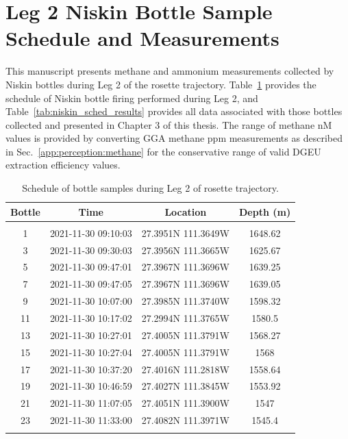 \section{Leg 2 Niskin Bottle Sample Schedule and Measurements}
\label{app:perception:niskin}
This manuscript presents methane and ammonium measurements collected by Niskin bottles during Leg 2 of the rosette trajectory. Table~\ref{tab:niskin_sched} provides the schedule of Niskin bottle firing performed during Leg 2, and Table~\ref{tab:niskin_sched_results} provides all data associated with those bottles collected and presented in Chapter 3 of this thesis. The range of methane nM values is provided by converting GGA methane ppm measurements as described in Sec.~\ref{app:perception:methane} for the conservative range of valid DGEU extraction efficiency values.
\begin{table}[h!]
    \centering
    \begin{tabular}{c|c|c|c}
        Bottle & Time & Location & Depth (m) \\
        \hline
        \hline
        &&&\\
        1 & 2021-11-30 09:10:03 & 27.3951N 111.3649W & 1648.62 \\
        3 & 2021-11-30 09:30:03 & 27.3956N 111.3665W & 1625.67 \\
        5 & 2021-11-30 09:47:01 & 27.3967N 111.3696W & 1639.25 \\
        7 & 2021-11-30 09:47:05 & 27.3967N 111.3696W & 1639.05 \\
        9 & 2021-11-30 10:07:00 & 27.3985N 111.3740W & 1598.32 \\
        11 & 2021-11-30 10:17:02 & 27.2994N 111.3765W & 1580.5 \\
        13 & 2021-11-30 10:27:01 & 27.4005N 111.3791W & 1568.27 \\
        15 & 2021-11-30 10:27:04 & 27.4005N 111.3791W & 1568 \\
        17 & 2021-11-30 10:37:20 & 27.4016N 111.2818W & 1558.64 \\
        19 & 2021-11-30 10:46:59 & 27.4027N 111.3845W & 1553.92 \\
        21 & 2021-11-30 11:07:05 & 27.4051N 111.3900W & 1547 \\
        23 & 2021-11-30 11:33:00 & 27.4082N 111.3971W & 1545.4 \\
        &&&
    \end{tabular}
    \caption{Schedule of bottle samples during Leg 2 of rosette trajectory.}
    \label{tab:niskin_sched}
\end{table}

